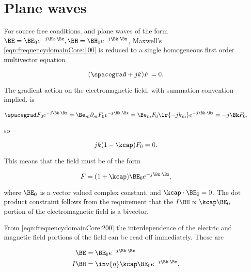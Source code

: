 \section{Plane waves}

For source free conditions, and plane waves of the form \( \BE = \BE_0 e^{-j \Bk \cdot \Bx}, \BH = \BH_0 e^{-j \Bk \cdot \Bx} \), Maxwell's \cref{eqn:frequencydomainCore:100} is reduced to a single homogeneous first order multivector equation

\begin{dmath}\label{eqn:frequencydomainCore:140}
(\spacegrad + j k) F = 0.
\end{dmath}

The gradient action on the electromagnetic field, with summation convention implied, is

\begin{dmath}\label{eqn:frequencydomainCore:160}
\spacegrad F_0 e^{-j \Bk \cdot \Bx}
=
\Be_m \partial_m
F_0 e^{-j \Bk \cdot \Bx}
=
\Be_m
F_0
\lr{ -j k_m }
e^{-j \Bk \cdot \Bx}
=
-j \Bk F_0,
\end{dmath}

so

\begin{dmath}\label{eqn:frequencydomainCore:180}
j k (1 - \kcap) F_0 = 0.
\end{dmath}

This means that the field must be of the form

\begin{dmath}\label{eqn:frequencydomainCore:200}
F = (1 + \kcap) \BE_0 e^{-j \Bk \cdot \Bx},
\end{dmath}

where \( \BE_0 \) is a vector valued complex constant, and \( \kcap \cdot \BE_0 = 0 \).  The dot product constraint follows from the requirement that the \( I \BH \propto \kcap \BE_0 \) portion of the electromagnetic field is a bivector.

From \cref{eqn:frequencydomainCore:200} the interdependence of the electric and magnetic field portions of the field can be read off immediately.  Those are

\begin{dmath}\label{eqn:frequencydomainCore:220}
\begin{aligned}
\BE &= \BE_0 e^{-j \Bk \cdot \Bx} \\
I \BH &= \inv{\eta} \kcap \BE_0 e^{-j \Bk \cdot \Bx},
\end{aligned}
\end{dmath}

